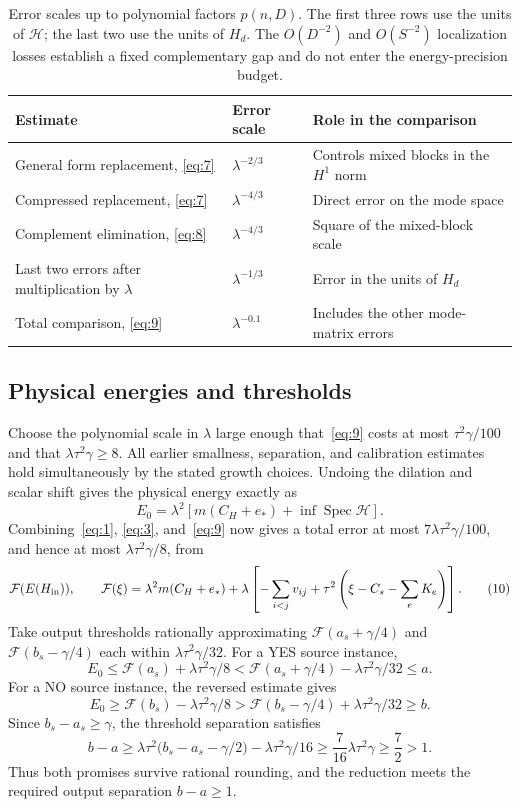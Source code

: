 \begin{table}[tbp]
\centering
\small
\begin{tabular}{@{}p{.43\linewidth}p{.18\linewidth}p{.30\linewidth}@{}}
\toprule
Estimate & Error scale & Role in the comparison \\
\midrule
General form replacement, \eqref{eq:7}
 & $\lambda^{-2/3}$ & Controls mixed blocks in the $H^1$ norm \\
Compressed replacement, \eqref{eq:7}
 & $\lambda^{-4/3}$ & Direct error on the mode space \\
Complement elimination, \eqref{eq:8}
 & $\lambda^{-4/3}$ & Square of the mixed-block scale \\
Last two errors after multiplication by $\lambda$
 & $\lambda^{-1/3}$ & Error in the units of $H_d$ \\
Total comparison, \eqref{eq:9}
 & $\lambda^{-0.1}$ & Includes the other mode-matrix errors \\
\bottomrule
\end{tabular}
\caption{Error scales up to polynomial factors $p(n,D)$. The first three
rows use the units of $\mathcal H$; the last two use the units of $H_d$.
The $O(D^{-2})$ and $O(S^{-2})$ localization losses establish a fixed
complementary gap and do not enter the energy-precision budget.}
\label{tab:error-scales}
\end{table}

\subsection{Physical energies and thresholds}\label{subsec:physical-thresholds}

Choose the polynomial scale in $\lambda$ large enough that~\eqref{eq:9}
costs at most $\tau^2\gamma/100$ and that $\lambda\tau^2\gamma\ge8$.
All earlier smallness, separation, and calibration estimates hold
simultaneously by the stated growth choices. Undoing the dilation and
scalar shift gives the physical energy exactly as
\[
 E_0=\lambda^2\left[m(C_H+e_*)+
                         \inf\operatorname{Spec}\mathcal H\right].
\]
Combining~\eqref{eq:1}, \eqref{eq:3}, and~\eqref{eq:9} now gives a
total error at most $7\lambda\tau^2\gamma/100$, and hence at most
$\lambda\tau^2\gamma/8$, from
\[
       \mathcal F(E(H_{\rm in})),\qquad
       \mathcal F(\xi)=
           \lambda^2 m(C_H+e_*)+
           \lambda\left[-\sum_{i<j}v_{ij}
                    +\tau^2\left(\xi-C_s-\sum_e K_e\right)\right].            \tag{10}\label{eq:10}
\]
Take output thresholds rationally approximating \(\mathcal F(a_s+\gamma/4)\) and \(\mathcal F(b_s-\gamma/4)\) each within \(\lambda\tau^2\gamma/32\). For a YES source instance,
\[
 E_0\le\mathcal F(a_s)+\lambda\tau^2\gamma/8
       <\mathcal F(a_s+\gamma/4)-\lambda\tau^2\gamma/32\le a.
\]
For a NO source instance, the reversed estimate gives
\[
 E_0\ge\mathcal F(b_s)-\lambda\tau^2\gamma/8
       >\mathcal F(b_s-\gamma/4)+\lambda\tau^2\gamma/32\ge b.
\]
Since $b_s-a_s\ge\gamma$, the threshold separation satisfies
\[
 b-a\ge\lambda\tau^2\bigl(b_s-a_s-\gamma/2\bigr)
                   -\lambda\tau^2\gamma/16
      \ge\frac7{16}\lambda\tau^2\gamma\ge\frac72>1.
\]
Thus both promises survive rational rounding, and the reduction meets
the required output separation \(b-a\ge1\).

